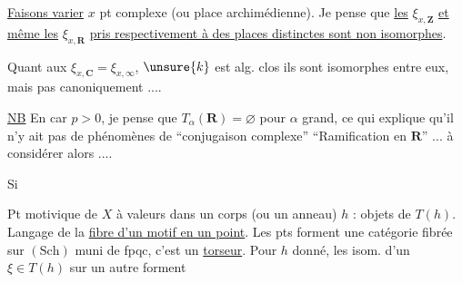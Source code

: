 \uline{Faisons varier} $x$ pt complexe (ou place archimédienne). Je pense que \uline{les} $\xi_{x,\mathbf Z}$ \uline{et même les} $\xi_{x,\mathbf R}$  \uline{pris respectivement à des places distinctes sont non isomorphes}.


Quant aux $\xi_{x,\mathbf C}=\xi_{x,\infty}$,    $\unsure{k}$ est  alg. clos ils sont isomorphes entre eux, mais pas canoniquement ....

\uline{NB} En car $p>0$, je pense que $T_\alpha(\mathbf R)=\varnothing$ pour $\alpha$ grand, ce qui explique qu'il n'y ait pas de phénomènes de ``conjugaison complexe'' ``Ramification en $\mathbf R$'' ... à considérer alors ....


Si


Pt motivique de $X$ à valeurs dans un corps (ou un anneau) $h$ : objets de $T(h)$. Langage de la \uline{fibre d'un motif en un point}. Les pts forment une catégorie fibrée sur $(\mathrm{Sch})$ muni de fpqc,  c'est un \uline{torseur}. Pour $h$ donné, les isom. d'un  $\xi\in T(h)$ sur un autre forment 

